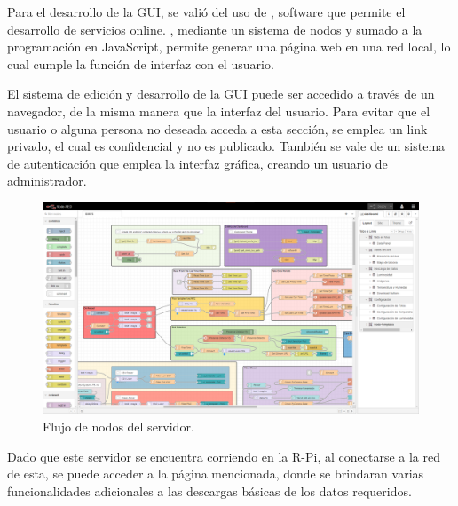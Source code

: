 Para el desarrollo de la GUI, se valió del uso de \nodered, software que permite el desarrollo de servicios online. \nodered, mediante un sistema de nodos y sumado a la programación en JavaScript, permite generar una página web en una red local, lo cual cumple la función de interfaz con el usuario.

El sistema de edición y desarrollo de la GUI puede ser accedido a través de un navegador, de la misma manera que la interfaz del usuario. Para evitar que el usuario o alguna persona no deseada acceda a esta sección, se emplea un link privado, el cual es confidencial y no es publicado. También se vale de un sistema de autenticación que emplea la interfaz gráfica, creando un usuario de administrador.
\begin{figure}[H]
	\centering
	\includegraphics[width=0.9\linewidth]{ImagenesIngenieria de Detalle/Node-Red-Flow}
	\caption{Flujo de nodos del servidor.}
	\label{fig:node_red_flow}
\end{figure}

Dado que este servidor se encuentra corriendo en la R-Pi, al conectarse a la red de esta, se puede acceder a la página mencionada, donde se brindaran varias funcionalidades adicionales a las descargas básicas de los datos requeridos.


